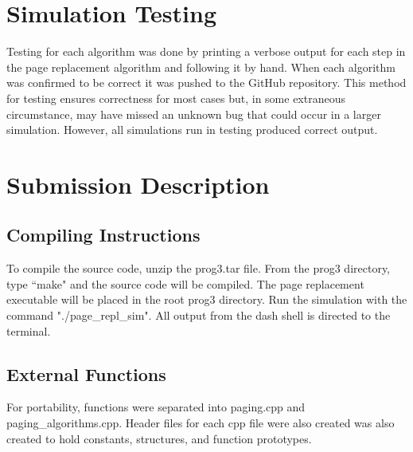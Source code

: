 \documentclass[11pt]{article}
\begin{document}
\begin{multicols}{2}
\section{Simulation Testing}\label{testing} 
Testing for each algorithm was done by printing a verbose output for each step in the page replacement algorithm and following it by hand. When each algorithm was confirmed to be correct it was pushed to the GitHub repository. This method for testing ensures correctness for most cases but, in some extraneous circumstance, may have missed an unknown bug that could occur in a larger simulation. However, all simulations run in testing produced correct output.

\section{Submission Description}\label{submission_description}
\subsection{Compiling Instructions}
To compile the source code, unzip the prog3.tar file. From the prog3 directory, type ``make" and the source code will be compiled. The page replacement executable will be placed in the root prog3 directory. Run the simulation with the command "./page\_repl\_sim". All output from the dash shell is directed to the terminal.

\subsection{External Functions}
For portability, functions were separated into paging.cpp and paging\_algorithms.cpp. Header files for each cpp file were also created was also created to hold constants, structures, and function prototypes.

\end{multicols}

\end{document}
